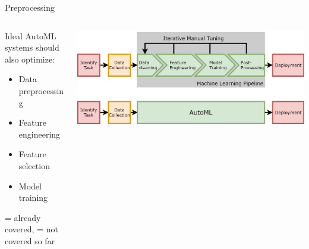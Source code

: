 

\usepackage[normalem]{ulem}
\usepackage{pifont}
\usepackage{relsize}
\renewcommand{\lit}[1]{{\smaller\color{black!60}[#1]}}
\subtitle{Preprocessing}



	
	\maketitle
	
	\begin{frame}[c]{Preprocessing}
		\begin{columns}
			\begin{column}{0.5\textwidth} 
				Ideal AutoML systems should also optimize: 
				\begin{itemize}
					\item[\ding{55}] Data preprocessing
					\item[\ding{55}] Feature engineering
					\item[\ding{55}] Feature selection
					\item[\ding{51}] Model training
				\end{itemize}
				\vspace{1em}
				{\tiny {} = already covered,  = not covered so far}
			\end{column}%
			\begin{column}{0.5\textwidth}
				\begin{center}
					\includegraphics[width = \linewidth]{images/AutoMLPipeline.jpg}  
				\end{center}
			\end{column}
		\end{columns}
		
	\end{frame}
	

